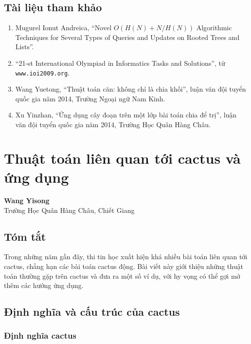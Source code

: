 \documentclass[11pt]{article}
\begin{document}
\subsection{Tài liệu tham khảo}

\begin{enumerate}
  \item Mugurel Ionut Andreica, ``Novel \(O(H(N)+N/H(N))\) Algorithmic
  Techniques for Several Types of Queries and Updates on Rooted Trees and
  Lists''.
  \item ``21-st International Olympiad in Informatics Tasks and Solutions'',
  từ \texttt{www.ioi2009.org}.
  \item Wang Yuetong, ``Thuật toán căn: không chỉ là chia khối'', luận văn đội
  tuyển quốc gia năm 2014, Trường Ngoại ngữ Nam Kinh.
  \item Xu Yinzhan, ``Ứng dụng cây đoạn trên một lớp bài toán chia để trị'',
  luận văn đội tuyển quốc gia năm 2014, Trường Học Quân Hàng Châu.
\end{enumerate}

\section{Thuật toán liên quan tới cactus và ứng dụng}

\begin{center}
\textbf{Wang Yisong}\\
Trường Học Quân Hàng Châu, Chiết Giang
\end{center}

\subsection*{Tóm tắt}

Trong những năm gần đây, thi tin học xuất hiện khá nhiều bài toán liên quan tới
cactus, chẳng hạn các bài toán cactus động. Bài viết này giới thiệu những thuật
toán thường gặp trên cactus và đưa ra một số ví dụ, với hy vọng có thể gợi mở
thêm các hướng ứng dụng.

\subsection{Định nghĩa và cấu trúc của cactus}

\subsubsection{Định nghĩa cactus}
\end{document}
